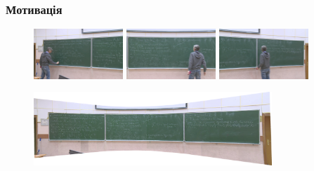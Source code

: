 \begin{frame}
    \frametitle{Мотивація}
    \begin{figure}
        \includegraphics[width=0.3\textwidth]{images/kratnye_intergraly_left.png}
        \quad
        \includegraphics[width=0.3\textwidth]{images/kratnye_intergraly_center.png}
        \quad
        \includegraphics[width=0.3\textwidth]{images/kratnye_intergraly_right.png}
    \end{figure}
    \begin{figure}
        \includegraphics[width=0.8\textwidth]{images/kratnye_integraly_panorama.png}
    \end{figure}
\end{frame}
